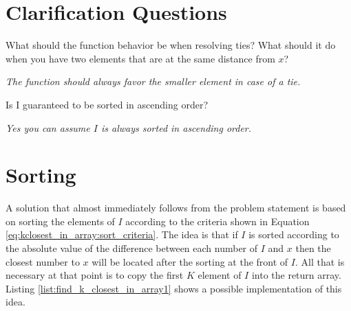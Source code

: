 \section{Clarification Questions}

\begin{QandA}
	\item \item \begin{questionitem} \begin{question} What should the function behavior be when resolving ties? What should it do when you have two
	elements that are at the same distance from $x$? \end{question}
	\begin{answered}
		\textit{The function should always favor the smaller element in case of a tie.}
	\end{answered} \end{questionitem}
	
	\item \begin{questionitem} \begin{question} Is I guaranteed to be sorted in ascending order?  \end{question} 	 
    \begin{answered}
		\textit{Yes you can assume $I$ is always sorted in ascending order.}
	\end{answered} \end{questionitem}
	
\end{QandA}

\section{Sorting}
\label{sec:find_k_closest_in_array:sorting}
A solution that almost immediately follows from the problem statement is based on
sorting the elements of $I$ according to the criteria shown in Equation
\ref{eq:kclosest_in_array:sort_criteria}. The idea is that if $I$ is sorted according to the
absolute value of the difference between each number of $I$ and $x$ then the closest number to $x$
will be located after the sorting at the front of $I$. All that is necessary at that point is to copy
the first $K$ element of $I$ into the return array. Listing \ref{list:find_k_closest_in_array1}
shows a possible implementation of this idea. 


